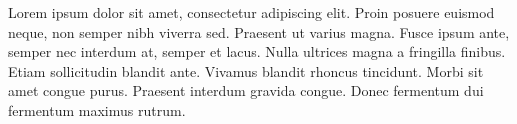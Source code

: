 \medskip

Lorem ipsum dolor sit amet, consectetur adipiscing elit. Proin posuere euismod neque, non semper nibh viverra sed. Praesent ut varius magna. Fusce ipsum ante, semper nec interdum at, semper et lacus. Nulla ultrices magna a fringilla finibus. Etiam sollicitudin blandit ante. Vivamus blandit rhoncus tincidunt. Morbi sit amet congue purus. Praesent interdum gravida congue. Donec fermentum dui fermentum maximus rutrum.

